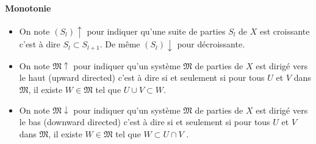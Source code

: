 \paragraph{Monotonie}
\begin{defi}
 \begin{itemize}
   \item On note $(S_l)\uparrow$ pour indiquer qu'une suite de parties $S_l$ de $X$ est croissante c'est à dire $S_l \subset S_{l+1}$. De même $(S_l)\downarrow$ pour décroissante.
   \item On note $\mathfrak{M}\uparrow$ pour indiquer qu'un système $\mathfrak{M}$ de parties de $X$ est dirigé vers le haut (upward directed) c'est à dire si et seulement si pour tous $U$ et $V$ dans $\mathfrak{M}$, il existe $W\in \mathfrak{M}$ tel que $U \cup V \subset W$.
   \item On note $\mathfrak{M}\downarrow$ pour indiquer qu'un système $\mathfrak{M}$ de parties de $X$ est dirigé vers le bas (downward directed) c'est à dire si et seulement si pour tous $U$ et $V$ dans $\mathfrak{M}$, il existe $W\in \mathfrak{M}$ tel que $W \subset  U \cap V$ .
 \end{itemize}
\end{defi}

